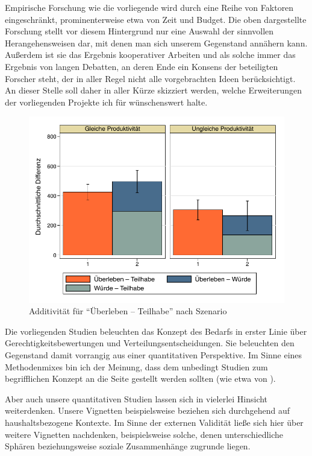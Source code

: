 \documentclass[justified,nobib,symmetric,twoside]{tufte-handout}
\begin{document}
Empirische Forschung wie die vorliegende wird durch eine Reihe von Faktoren eingeschränkt, prominenterweise etwa von Zeit und Budget.
Die oben dargestellte Forschung stellt vor diesem Hintergrund nur eine Auswahl der sinnvollen Herangehensweisen dar, mit denen man sich unserem Gegenstand annähern kann.
Außerdem ist sie das Ergebnis kooperativer Arbeiten und als solche immer das Ergebnis von langen Debatten, an deren Ende ein Konsens der beteiligten Forscher steht, der in aller Regel nicht alle vorgebrachten Ideen berücksichtigt.
An dieser Stelle soll daher in aller Kürze skizziert werden, welche Erweiterungen der vorliegenden Projekte ich für wünschenswert halte.

\begin{figure}[t]\label{fig:abbildung_20}
   \center
   \caption{Additivität für \enquote{Überleben -- Teilhabe} nach Szenario}
   \includegraphics[width=0.99\linewidth]{figure_20.pdf}
\end{figure}

Die vorliegenden Studien beleuchten das Konzept des Bedarfs in erster Linie über Gerechtigkeitsbewertungen und Verteilungsentscheidungen.
Sie beleuchten den Gegenstand damit vorrangig aus einer quantitativen Perspektive.
Im Sinne eines Methodenmixes bin ich der Meinung, dass dem unbedingt Studien zum begrifflichen Konzept an die Seite gestellt werden sollten (wie etwa von \cite{poelzler_typicality_2022}).

Aber auch unsere quantitativen Studien lassen sich in vielerlei Hinsicht weiterdenken.
Unsere Vignetten beispielsweise beziehen sich durchgehend auf haushaltsbezogene Kontexte.
Im Sinne der externen Validität ließe sich hier über weitere Vignetten nachdenken, beispielsweise solche, denen unterschiedliche Sphären beziehungsweise soziale Zusammenhänge zugrunde liegen.
\end{document}
